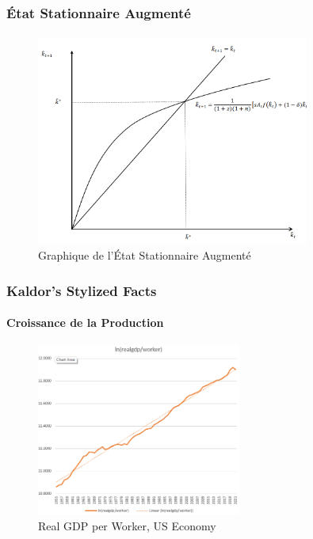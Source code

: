 \documentclass{beamer}
\begin{document}
\begin{frame}
    \frametitle{État Stationnaire Augmenté}
    \framesubtitle{}

    \begin{figure}
        \centering
        \includegraphics[width=0.8\textwidth]{graphs/ss_solow_s3.png} %
        \caption{Graphique de l'État Stationnaire Augmenté}
    \end{figure}
\end{frame}




\begin{frame}
    \frametitle{Kaldor's Stylized Facts}
    \hypertarget{growth}{} %
    \framesubtitle{Croissance de la Production}
        \begin{figure}
            \centering
            \includegraphics[width=0.6\textwidth]{graphs/lnrgdp_usa.png}
            \caption{Real GDP per Worker, US Economy
            \hyperlink{kaldor}{}}
        \end{figure}
\end{frame}
\end{document}
